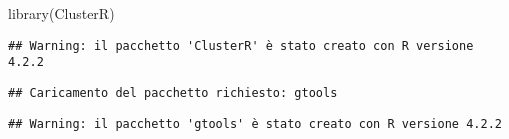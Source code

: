 \documentclass[
]{article}
\newenvironment{Shaded}{\begin{snugshade}}{\end{snugshade}}
\newcommand{\FunctionTok}[1]{\textcolor[rgb]{0.00,0.00,0.00}{#1}}
\newcommand{\NormalTok}[1]{#1}
\begin{document}
\begin{Shaded}
\begin{Highlighting}[]
\FunctionTok{library}\NormalTok{(ClusterR)}
\end{Highlighting}
\end{Shaded}

\begin{verbatim}
## Warning: il pacchetto 'ClusterR' è stato creato con R versione 4.2.2
\end{verbatim}

\begin{verbatim}
## Caricamento del pacchetto richiesto: gtools
\end{verbatim}

\begin{verbatim}
## Warning: il pacchetto 'gtools' è stato creato con R versione 4.2.2
\end{verbatim}
\end{document}
